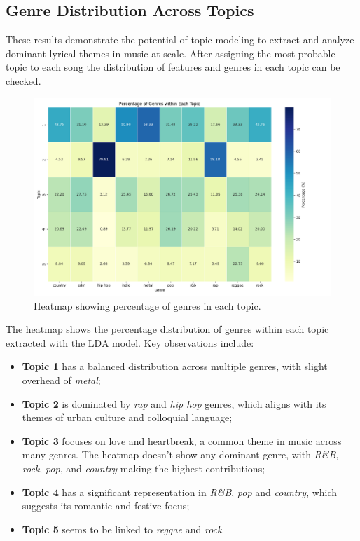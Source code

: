 \subsection{Genre Distribution Across Topics}
These results demonstrate the potential of topic modeling to extract and
analyze dominant lyrical themes in music at scale. After assigning the most
probable topic to each song the distribution of features and genres in each
topic can be checked.


\begin{center}
\begin{figure}[H]
  \centering
  \includegraphics[width=5in]{img/lda_genres_distribution.png}
  \caption{Heatmap showing percentage of genres in each topic.}
  \label{Figure:fig_eh}
\end{figure}
\end{center}

The heatmap shows the percentage distribution of genres within each topic
extracted with the LDA model. Key observations include:

\begin{itemize}
  \item \textbf{Topic 1} has a balanced distribution across multiple genres,
    with slight overhead of \textit{metal};
  \item \textbf{Topic 2} is dominated by \textit{rap} and \textit{hip hop}
    genres, which aligns with its themes of urban culture and colloquial
    language;
  \item \textbf{Topic 3} focuses on love and heartbreak, a common theme in
    music across many genres. The heatmap doesn't show any dominant genre, with
    \textit{R\&B}, \textit{rock}, \textit{pop}, and \textit{country} making the
    highest contributions;
  \item \textbf{Topic 4} has a significant representation in \textit{R\&B},
    \textit{pop} and \textit{country}, which suggests its romantic and festive
    focus;
  \item \textbf{Topic 5} seems to be linked to \textit{reggae} and
    \textit{rock}.
\end{itemize}

